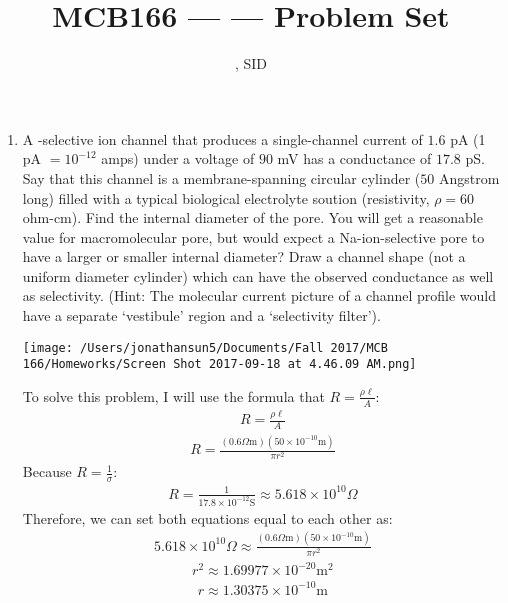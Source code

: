 \documentclass[11pt]{article}
\title{MCB166 --- \Session --- Problem Set \Homework}
\author{\Name, SID \SID}
\date{}
\begin{document}
\maketitle

\newpage
\begin{enumerate}[label=\arabic*.]
\item
A -selective ion channel that produces a single-channel current of $1.6$ pA (1 pA $= 10^{-12}$ amps) under a voltage of $90$ mV has a conductance of $17.8$ pS. Say that this channel is a membrane-spanning circular cylinder ($50$ Angstrom long) filled with a typical biological electrolyte soution (resistivity, $\rho = 60$ ohm-cm). Find the internal diameter of the pore. You will get a reasonable value for macromolecular pore, but would expect a Na-ion-selective pore to have a larger or smaller internal diameter? Draw a channel shape (not a uniform diameter cylinder) which can have the observed conductance as well as selectivity. (Hint: The molecular current picture of a channel profile would have a separate `vestibule' region and a `selectivity filter').
\begin{center}
\texttt{[image: /Users/jonathansun5/Documents/Fall 2017/MCB 166/Homeworks/Screen Shot 2017-09-18 at 4.46.09 AM.png]}
\end{center}
To solve this problem, I will use the formula that $R = \frac{\rho \ell} {A}$:
\begin{align*}
R = \frac{\rho \ell} {A}
\end{align*}
\begin{align*}
R = \frac{\left(0.6\Omega \text{m}\right) \left(50 \times 10^{-10} \text{m}\right)} {\pi r^2}
\end{align*}
Because $R = \frac{1} {\sigma}$:
\begin{align*}
R = \frac{1} {17.8 \times 10^{-12} \text{S}} \approx 5.618 \times 10^{10} \Omega
\end{align*}
Therefore, we can set both equations equal to each other as:
\begin{align*}
5.618 \times 10^{10} \Omega \approx \frac{\left(0.6\Omega \text{m}\right) \left(50 \times 10^{-10} \text{m}\right)} {\pi r^2}
\end{align*}
\begin{align*}
r^2 \approx 1.69977 \times 10^{-20} \text{m}^2
\end{align*}
\begin{align*}
r \approx 1.30375 \times 10^{-10} \text{m}
\end{align*}
\begin{align*}

\end{align*}
\end{enumerate}
\end{document}
